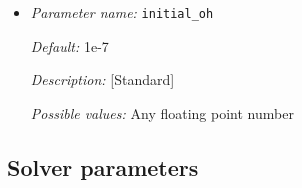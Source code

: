 \begin{itemize}
{\it Default:} 5.175e-6

{\it Description:} [Standard] 

{\it Possible values:} Any floating point number


\item {\it Parameter name:} {\tt initial\_oh}
\label{parameters:initial_oh}


{\it Default:} 1e-7

{\it Description:} [Standard] 

{\it Possible values:} Any floating point number


\end{itemize}



\subsection{Solver parameters}
\label{parameters:sovler}

